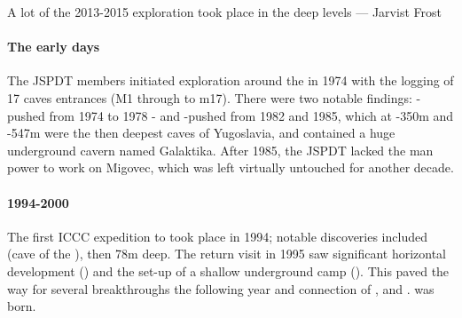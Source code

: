 \begin{marginfigure}
	\checkoddpage \ifoddpage \forcerectofloat \else \forceversofloat \fi
	\centering	{} 
  	\caption{A lot of the 2013-2015 exploration took place in the deep \protect{} levels --- Jarvist Frost}
	\end{marginfigure}
    
    
\paragraph{The early days} The JSPDT members initiated exploration around the  in 1974 with the logging of 17 caves entrances (M1 through to m17). There were two notable findings:  - pushed from 1974 to 1978 - and  -pushed from 1982 and 1985, which at -350m and -547m were the then deepest caves of Yugoslavia, and contained a huge underground cavern named Galaktika. After 1985, the JSPDT lacked the man power to work on Migovec, which was left virtually untouched for another decade. 


\paragraph{1994-2000} The first ICCC expedition to  took place in 1994; notable discoveries included  (cave of the ), then 78m deep. The return visit in 1995 saw significant horizontal development () and the set-up of a shallow underground camp (). This paved the way for several breakthroughs the following year and connection of ,  and .  was born.

